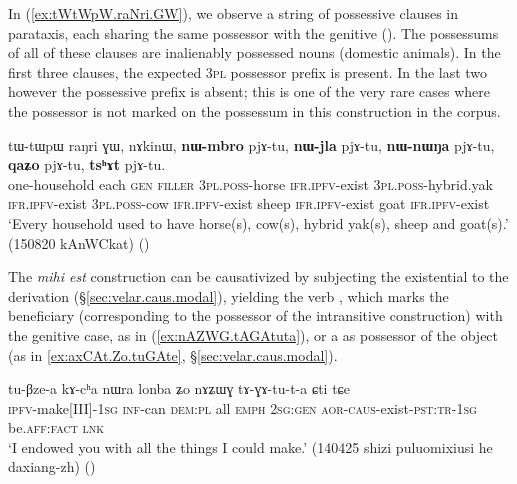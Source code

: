 In (\ref{ex:tWtWpW.raNri.GW}), we observe a string of possessive clauses in parataxis, each sharing the same possessor with the genitive (). The possessums of all of these clauses are inalienably possessed nouns (domestic animals). In the first three clauses, the expected \textsc{3pl} possessor prefix is present. In the last two however the possessive prefix is absent; this is one of the very rare cases where the possessor is not marked on the possessum in this construction in the corpus.
 
 \begin{exe}
\ex \label{ex:tWtWpW.raNri.GW}
\gll tɯ-tɯpɯ raŋri ɣɯ, nɤkinɯ, \textbf{nɯ-mbro} pjɤ-tu, \textbf{nɯ-jla} pjɤ-tu, \textbf{nɯ-nɯŋa} pjɤ-tu, \textbf{qaʑo} pjɤ-tu, \textbf{tsʰɤt} pjɤ-tu. \\
one-household each \textsc{gen} \textsc{filler} \textsc{3pl}.\textsc{poss}-horse \textsc{ifr}.\textsc{ipfv}-exist 
\textsc{3pl}.\textsc{poss}-hybrid.yak \textsc{ifr}.\textsc{ipfv}-exist \textsc{3pl}.\textsc{poss}-cow \textsc{ifr}.\textsc{ipfv}-exist sheep  \textsc{ifr}.\textsc{ipfv}-exist  goat  \textsc{ifr}.\textsc{ipfv}-exist  \\
\glt `Every household used to have horse(s), cow(s), hybrid yak(s), sheep and goat(s).' (150820 kAnWCkat)
()
 \end{exe}
 
 The  \textit{mihi est} construction can be causativized by subjecting the existential  to the  derivation (§\ref{sec:velar.caus.modal}), yielding the verb , which marks the beneficiary (corresponding to the possessor of the intransitive construction) with the genitive case, as  in (\ref{ex:nAZWG.tAGAtuta}), or a as possessor of the object (as in \ref{ex:axCAt.Zo.tuGAte}, §\ref{sec:velar.caus.modal}).
 
 \begin{exe}
\ex \label{ex:nAZWG.tAGAtuta}
\gll tu-βze-a kɤ-cʰa nɯra lonba ʑo nɤʑɯɣ tɤ-ɣɤ-tu-t-a ɕti tɕe \\
\textsc{ipfv}-make[III]-\textsc{1sg} \textsc{inf}-can \textsc{dem}:\textsc{pl} all \textsc{emph} \textsc{2sg}:\textsc{gen} \textsc{aor}-\textsc{caus}-exist-\textsc{pst}:\textsc{tr}-\textsc{1sg} be.\textsc{aff}:\textsc{fact} \textsc{lnk} \\
\glt  `I endowed you with all the things I could make.' (140425 shizi puluomixiusi he daxiang-zh)
()
 \end{exe}
 
